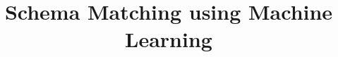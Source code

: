 \documentclass[conference]{IEEEtran}
\begin{document}
%
\title{Schema Matching using Machine Learning}




\author{
\and
{}
\and
{}
}


% 








\maketitle
\end{document}
